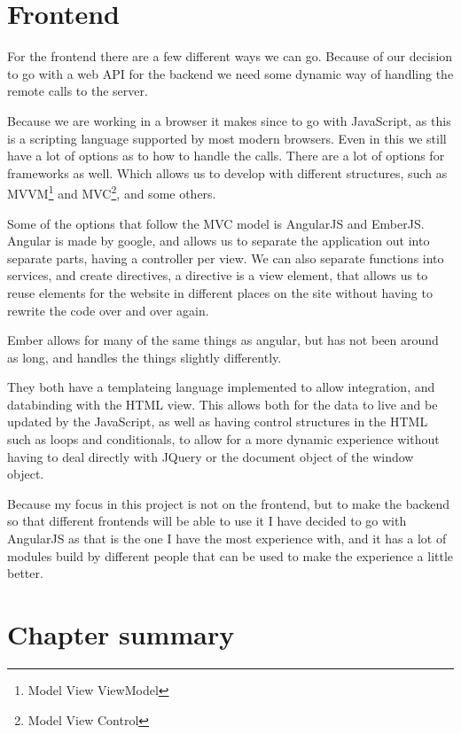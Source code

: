\section{Frontend}
\label{sec:Frontend}
For the frontend there are a few different ways we can go. Because of our decision to go with a web API for the backend we need some dynamic way of handling the remote calls to the server.

Because we are working in a browser it makes since to go with JavaScript, as this is a scripting language supported by most modern browsers. Even in this we still have a lot of options as to how to handle the calls. There are a lot of options for frameworks as well. Which allows us to develop with different structures, such as MVVM\footnote{Model View ViewModel} and MVC\footnote{Model View Control}, and some others.

Some of the options that follow the MVC model is AngularJS and EmberJS. Angular is made by google\cite{angularjs}, and allows us to separate the application out into separate parts, having a controller per view. We can also separate functions into services, and create directives, a directive is a view element, that allows us to reuse elements for the website in different places on the site without having to rewrite the code over and over again.

Ember allows for many of the same things as angular, but has not been around as long, and handles the things slightly differently\cite{emberjs}.

They both have a templateing language implemented to allow integration, and databinding with the HTML view. This allows both for the data to live and be updated by the JavaScript, as well as having control structures in the HTML such as loops and conditionals, to allow for a more dynamic experience without having to deal directly with JQuery or the document object of the window object.

Because my focus in this project is not on the frontend, but to make the backend so that different frontends will be able to use it I have decided to go with AngularJS as that is the one I have the most experience with, and it has a lot of modules build by different people that can be used to make the experience a little better.

\section{Chapter summary }
